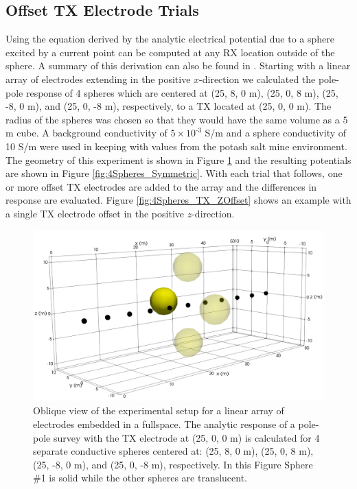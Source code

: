 \documentclass[preprint,authoryear,12pt]{elsarticle}
\begin{document}
\subsection{Offset TX Electrode Trials}
\label{sec:TheoreticalAnalysis_OffsetTrials}

Using the equation derived by \citet{Wait1982m} the analytic electrical potential due to a sphere excited by a current point can be computed at any RX location outside of the sphere. A summary of this derivation can also be found in \citet{Mitchell2020}.  Starting with a linear array of electrodes extending in the positive $x$-direction we calculated the pole-pole response of 4 spheres which are centered at (25, 8, 0 m), (25, 0, 8 m), (25, -8, 0 m), and (25, 0, -8 m), respectively, to a TX located at (25, 0, 0 m). The radius of the spheres was chosen so that they would have the same volume as a 5 m cube. A background conductivity of $5 \times 10^{\text{-3}}$ S/m and a sphere conductivity of 10 S/m were used in keeping with values from the potash salt mine environment. The geometry of this experiment is shown in Figure \ref{fig:4Spheres_ObliqueView} and the resulting potentials are shown in Figure \ref{fig:4Spheres_Symmetric}. With each trial that follows, one or more offset TX electrodes are added to the array and the differences in response are evaluated. Figure \ref{fig:4Spheres_TX_ZOffset} shows an example with a single TX electrode offset in the positive $z$-direction.

\begin{figure}[htp]
   \begin{center}
      \includegraphics[trim=0cm 0.0cm 0cm 0.0cm, clip=true,width=0.65\linewidth]{./figures/Fig1.png}
   \end{center}
\caption{Oblique view of the experimental setup for a linear array of electrodes embedded in a fullspace. The analytic response of a pole-pole survey with the TX electrode at (25, 0, 0 m) is calculated for 4 separate conductive spheres centered at: (25, 8, 0 m), (25, 0, 8 m), (25, -8, 0 m), and (25, 0, -8 m), respectively. In this Figure Sphere \#1 is solid while the other spheres are translucent.}
\label{fig:4Spheres_ObliqueView}
\end{figure}
\end{document}

